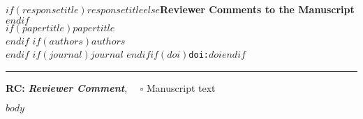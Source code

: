 \documentclass{article}
\begin{document}
{\Large\bf $if(responsetitle)$$responsetitle$$else$Reviewer Comments to the Manuscript$endif$}\\[1em]
$if(papertitle)${\huge $papertitle$}\\[1em]$endif$
$if(authors)${$authors$}\\$endif$
$if(journal)${\it $journal$ }$endif$$if(doi)$\texttt{doi:$doi$}$endif$\\
\hrule

\hfill {\bfseries RC:} \textbf{\textit{Reviewer Comment}}, \(\quad\square\) Manuscript text

$body$
\end{document}
